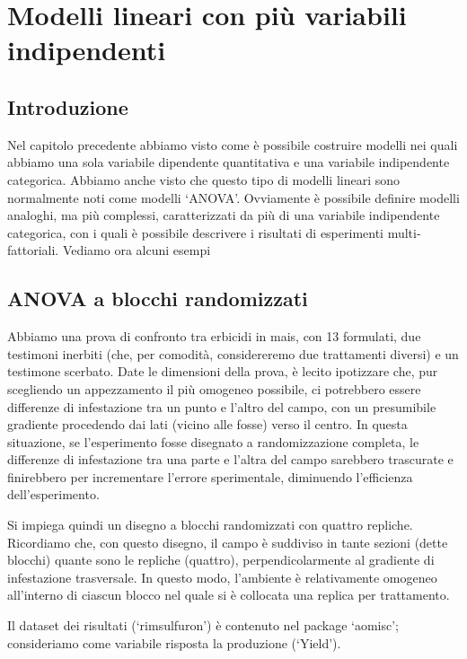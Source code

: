 \documentclass[a4paper,12pt,oneside]{book}
\theoremstyle{definition}
\theoremstyle{definition}
\theoremstyle{definition}
\theoremstyle{remark}
\begin{document}
\chapter{Modelli lineari con più variabili
indipendenti}\label{modelli-lineari-con-piu-variabili-indipendenti}

\section{Introduzione}\label{introduzione-3}

Nel capitolo precedente abbiamo visto come è possibile costruire modelli
nei quali abbiamo una sola variabile dipendente quantitativa e una
variabile indipendente categorica. Abbiamo anche visto che questo tipo
di modelli lineari sono normalmente noti come modelli `ANOVA'.
Ovviamente è possibile definire modelli analoghi, ma più complessi,
caratterizzati da più di una variabile indipendente categorica, con i
quali è possibile descrivere i risultati di esperimenti
multi-fattoriali. Vediamo ora alcuni esempi

\section{ANOVA a blocchi
randomizzati}\label{anova-a-blocchi-randomizzati}

Abbiamo una prova di confronto tra erbicidi in mais, con 13 formulati,
due testimoni inerbiti (che, per comodità, considereremo due trattamenti
diversi) e un testimone scerbato. Date le dimensioni della prova, è
lecito ipotizzare che, pur scegliendo un appezzamento il più omogeneo
possibile, ci potrebbero essere differenze di infestazione tra un punto
e l'altro del campo, con un presumibile gradiente procedendo dai lati
(vicino alle fosse) verso il centro. In questa situazione, se
l'esperimento fosse disegnato a randomizzazione completa, le differenze
di infestazione tra una parte e l'altra del campo sarebbero trascurate e
finirebbero per incrementare l'errore sperimentale, diminuendo
l'efficienza dell'esperimento.

Si impiega quindi un disegno a blocchi randomizzati con quattro
repliche. Ricordiamo che, con questo disegno, il campo è suddiviso in
tante sezioni (dette blocchi) quante sono le repliche (quattro),
perpendicolarmente al gradiente di infestazione trasversale. In questo
modo, l'ambiente è relativamente omogeneo all'interno di ciascun blocco
nel quale si è collocata una replica per trattamento.

Il dataset dei risultati (`rimsulfuron') è contenuto nel package
`aomisc'; consideriamo come variabile risposta la produzione (`Yield').
\end{document}
